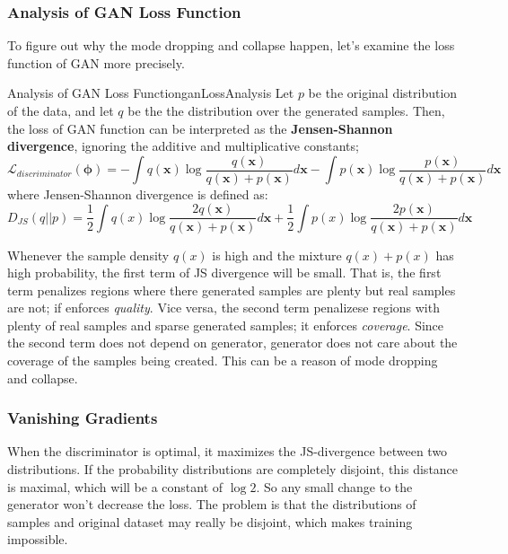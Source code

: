 \documentclass{article}
\begin{document}
        \subsubsection{Analysis of GAN Loss Function}
            To figure out why the mode dropping and collapse happen, let's examine the loss function of
            GAN more precisely.
            \begin{thm}{Analysis of GAN Loss Function}{ganLossAnalysis}
                Let $p$ be the original distribution of the data, and let $q$ be the the distribution over the generated samples.
                Then, the loss of GAN function can be interpreted as the \textbf{Jensen-Shannon divergence}, ignoring the additive and multiplicative
                constants;
                \[
                \mathcal{L}_{discriminator}(\bm{\phi})=-\int q(\textbf{x})\log{\frac{q(\textbf{x})}{q(\textbf{x}) + p(\textbf{x})}}d\textbf{x}
                -\int p(\textbf{x})\log{\frac{p(\textbf{x})}{q(\textbf{x}) + p(\textbf{x})}}d\textbf{x}
                \]
                where Jensen-Shannon divergence is defined as:
                \[
                D_{JS}(q||p) = \frac{1}{2}\int q(x)\log{\frac{2q(\textbf{x})}{q(\textbf{x}) + p(\textbf{x})}}d\textbf{x}
                + \frac{1}{2}\int p(x)\log{\frac{2p(\textbf{x})}{q(\textbf{x}) + p(\textbf{x})}}d\textbf{x}
                \]
            \end{thm}

            Whenever the sample density $q(x)$ is high and the mixture $q(x) + p(x)$ has high probability, the first
            term of JS divergence will be small. That is, the first term penalizes regions where there generated samples are plenty
            but real samples are not; if enforces \emph{quality}.
            Vice versa, the second term penalizese regions with plenty of real samples and sparse generated samples; it enforces \emph{coverage}.
            Since the second term does not depend on generator, generator does not care about the coverage of the samples being created.
            This can be a reason of mode dropping and collapse.

        \subsubsection{Vanishing Gradients}
            When the discriminator is optimal, it maximizes the JS-divergence between two distributions.
            If the probability distributions are completely disjoint, this distance is maximal, which will be a constant of $\log{2}$.
            So any small change to the generator won't decrease the loss.
            The problem is that the distributions of samples and original dataset may really be disjoint, which
            makes training impossible.
\end{document}
